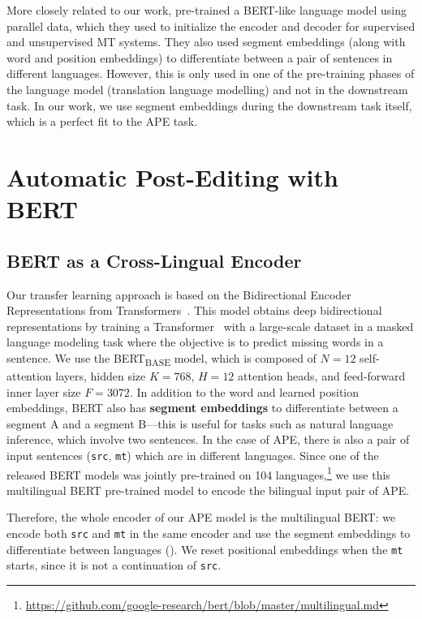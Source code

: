 More closely related to our work, \citet{lample2019xlm}
pre-trained a BERT-like language model using parallel data, which
they used to initialize the encoder and decoder for supervised and
unsupervised MT systems. They also used segment embeddings (along
with word and position embeddings) to differentiate between a pair of
sentences in different languages. However, this is only used in one
of the pre-training phases of the language model (translation
language modelling) and not in the downstream task. In our work, we
use segment embeddings during the downstream task itself, which is a
perfect fit to the APE task.

\section{Automatic Post-Editing with BERT}\label{sec:ape_bert}

\subsection{BERT as a Cross-Lingual Encoder}

Our transfer learning approach is based on the Bidirectional Encoder
Representations from Transformers~\citep[BERT;][]{devlin2018bert}.
This model obtains deep bidirectional representations by training a
Transformer~\citep{vaswani2017attention} with a large-scale dataset
in a masked language modeling task where the objective is to predict
missing words in a sentence. We use the BERT\textsubscript{BASE}
model, which is composed of $N=12$ self-attention layers, hidden size
$K=768$, $H=12$ attention heads, and feed-forward inner layer size
$F=3072$. In addition to the word and learned position embeddings,
BERT also has {\bf segment embeddings} to differentiate between a
segment A and a segment B---this is useful for tasks such as natural
language inference, which involve two sentences. In the case of APE,
there is also a pair of input sentences ({\tt src}, {\tt mt}) which
are in different languages. Since one of the released BERT models was
jointly pre-trained on 104 languages,\footnote{
    \url{https://github.com/google-research/bert/blob/master/multilingual.md}}
we use this multilingual BERT pre-trained model to encode the
bilingual input pair of APE.

Therefore, the whole encoder of our APE model is the multilingual
BERT: we encode both {\tt src} and {\tt mt} in the same encoder and
use the segment embeddings to differentiate between languages
(). We reset positional
embeddings when the {\tt mt} starts, since it is not a continuation
of {\tt src}.

